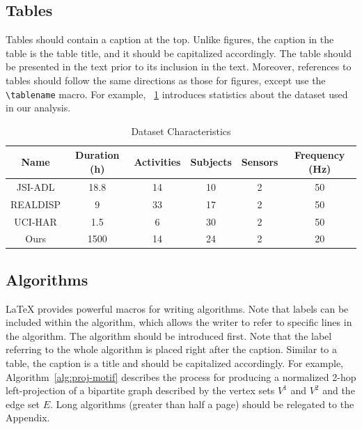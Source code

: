 \subsection{Tables}\label{sec:latex:tables}

Tables should contain a caption at the top. Unlike figures, the caption in the table is the table title, and it should be capitalized accordingly. The table should be presented in the text prior to its inclusion in the text. Moreover, references to tables should follow the same directions as those for figures, except use the \texttt{{\textbackslash}tablename} macro. For example, \tablename~\ref{tbl:dataset} introduces statistics about the dataset used in our analysis.

\begin{table}[!htb]
\caption{Dataset Characteristics}
\label{tbl:dataset}
\centering
\begin{tabular}{c|c|c|c|c|c}
\hline
\textbf{Name} & \textbf{Duration (h)} & \textbf{Activities} & \textbf{Subjects}  & \textbf{Sensors} & \textbf{Frequency (Hz)} \\ 
\hline
JSI-ADL & 18.8 & 14 & 10 & 2 & 50\\ 
REALDISP & 9 & 33 & 17 & 2 & 50\\ 
UCI-HAR & 1.5 & 6 & 30 & 2 & 50\\ 
Ours & 1500 & 14 & 24 & 2 & 20\\ 
\hline
\end{tabular}
\end{table}

\subsection{Algorithms}\label{sec:latex:algorithms}

LaTeX provides powerful macros for writing algorithms. Note that labels can be included within the algorithm, which allows the writer to refer to specific lines in the algorithm. The algorithm should be introduced first. Note that the label referring to the whole algorithm is placed right after the caption. Similar to a table, the caption is a title and should be capitalized accordingly. For example, Algorithm~\ref{alg:proj-motif} describes the process for producing a normalized 2-hop left-projection of a bipartite graph described by the vertex sets $V^1$ and $V^2$ and the edge set $E$. Long algorithms (greater than half a page) should be relegated to the Appendix.

